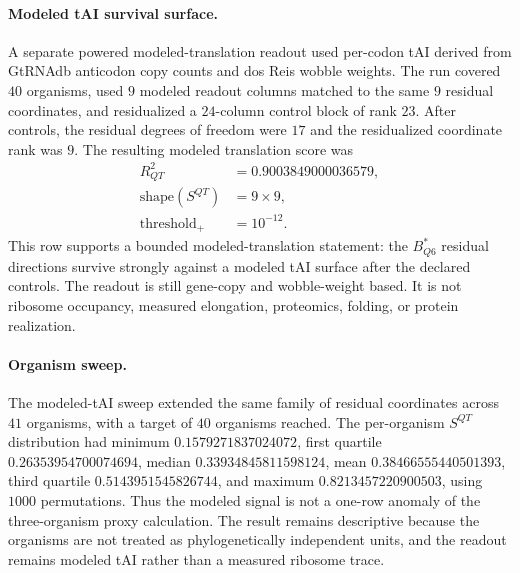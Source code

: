 \paragraph{Modeled tAI survival surface.}
A separate powered modeled-translation readout used per-codon tAI derived from GtRNAdb anticodon copy counts and dos Reis wobble weights.  The run covered $40$ organisms, used $9$ modeled readout columns matched to the same $9$ residual coordinates, and residualized a $24$-column control block of rank $23$.  After controls, the residual degrees of freedom were $17$ and the residualized coordinate rank was $9$.  The resulting modeled translation score was
$$
\begin{aligned}
R^2_{QT} &= 0.9003849000036579,\\
\mathrm{shape}(S^{QT}) &= 9\times 9,\\
\mathrm{threshold}_{+} &= 10^{-12}.
\end{aligned}
$$
This row supports a bounded modeled-translation statement: the $B^*_{Q6}$ residual directions survive strongly against a modeled tAI surface after the declared controls.  The readout is still gene-copy and wobble-weight based.  It is not ribosome occupancy, measured elongation, proteomics, folding, or protein realization.

\paragraph{Organism sweep.}
The modeled-tAI sweep extended the same family of residual coordinates across $41$ organisms, with a target of $40$ organisms reached.  The per-organism $S^{QT}$ distribution had minimum $0.1579271837024072$, first quartile $0.26353954700074694$, median $0.33934845811598124$, mean $0.38466555440501393$, third quartile $0.5143951545826744$, and maximum $0.8213457220900503$, using $1000$ permutations.  Thus the modeled signal is not a one-row anomaly of the three-organism proxy calculation.  The result remains descriptive because the organisms are not treated as phylogenetically independent units, and the readout remains modeled tAI rather than a measured ribosome trace.

